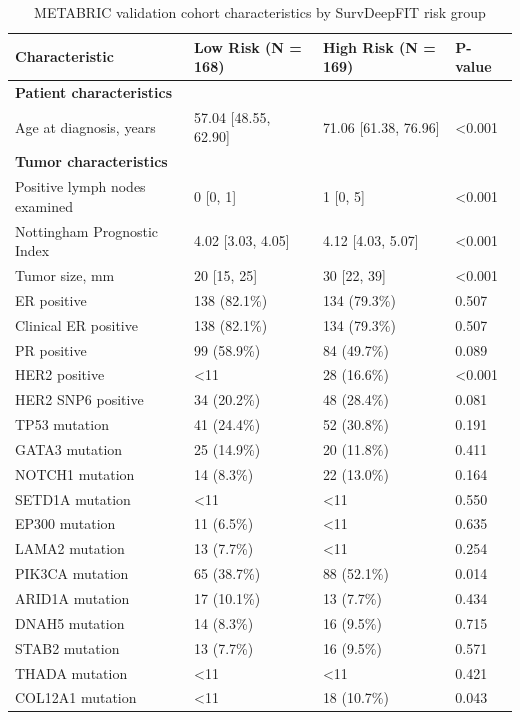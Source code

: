 \begin{table}[!htbp]
\centering
\caption{METABRIC validation cohort characteristics by SurvDeepFIT risk group}
\begin{tabular}{llll}
\toprule
Characteristic & Low Risk (N = 168) & High Risk (N = 169) & P-value \\
\midrule
\multicolumn{4}{l}{\textbf{Patient characteristics}} \\
Age at diagnosis, years & 57.04 [48.55, 62.90] & 71.06 [61.38, 76.96] & \textless{}0.001 \\
\midrule
\multicolumn{4}{l}{\textbf{Tumor characteristics}} \\
Positive lymph nodes examined & 0 [0, 1] & 1 [0, 5] & \textless{}0.001 \\
Nottingham Prognostic Index & 4.02 [3.03, 4.05] & 4.12 [4.03, 5.07] & \textless{}0.001 \\
Tumor size, mm & 20 [15, 25] & 30 [22, 39] & \textless{}0.001 \\
ER positive & 138 (82.1\%) & 134 (79.3\%) & 0.507 \\
Clinical ER positive & 138 (82.1\%) & 134 (79.3\%) & 0.507 \\
PR positive & 99 (58.9\%) & 84 (49.7\%) & 0.089 \\
HER2 positive & \textless{}11 & 28 (16.6\%) & \textless{}0.001 \\
HER2 SNP6 positive & 34 (20.2\%) & 48 (28.4\%) & 0.081 \\
TP53 mutation & 41 (24.4\%) & 52 (30.8\%) & 0.191 \\
GATA3 mutation & 25 (14.9\%) & 20 (11.8\%) & 0.411 \\
NOTCH1 mutation & 14 (8.3\%) & 22 (13.0\%) & 0.164 \\
SETD1A mutation & \textless{}11 & \textless{}11 & 0.550 \\
EP300 mutation & 11 (6.5\%) & \textless{}11 & 0.635 \\
LAMA2 mutation & 13 (7.7\%) & \textless{}11 & 0.254 \\
PIK3CA mutation & 65 (38.7\%) & 88 (52.1\%) & 0.014 \\
ARID1A mutation & 17 (10.1\%) & 13 (7.7\%) & 0.434 \\
DNAH5 mutation & 14 (8.3\%) & 16 (9.5\%) & 0.715 \\
STAB2 mutation & 13 (7.7\%) & 16 (9.5\%) & 0.571 \\
THADA mutation & \textless{}11 & \textless{}11 & 0.421 \\
COL12A1 mutation & \textless{}11 & 18 (10.7\%) & 0.043 \\

\end{tabular}
\end{table}
